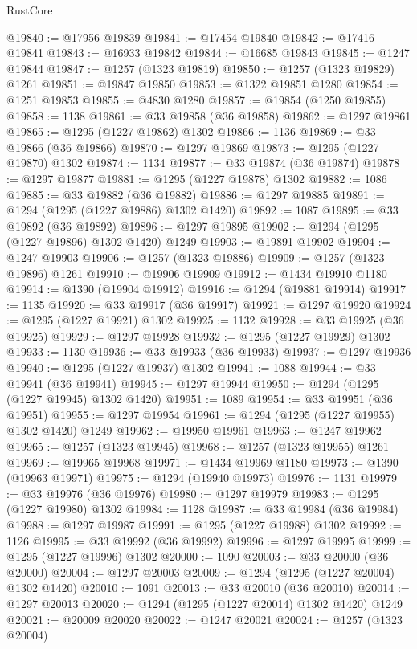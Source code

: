 \begin{lexlean}{RustCore}
\begin{coremodule}
@19840 := @17956 @19839
@19841 := @17454 @19840
@19842 := @17416 @19841
@19843 := @16933 @19842
@19844 := @16685 @19843
@19845 := @1247 @19844
@19847 := @1257 (@1323 @19819)
@19850 := @1257 (@1323 @19829) @1261
@19851 := @19847 @19850
@19853 := @1322 @19851 @1280
@19854 := @1251 @19853
@19855 := @4830 @1280
@19857 := @19854 (@1250 @19855)
@19858 := 1138
@19861 := @33 @19858 (@36 @19858)
@19862 := @1297 @19861
@19865 := @1295 (@1227 @19862) @1302
@19866 := 1136
@19869 := @33 @19866 (@36 @19866)
@19870 := @1297 @19869
@19873 := @1295 (@1227 @19870) @1302
@19874 := 1134
@19877 := @33 @19874 (@36 @19874)
@19878 := @1297 @19877
@19881 := @1295 (@1227 @19878) @1302
@19882 := 1086
@19885 := @33 @19882 (@36 @19882)
@19886 := @1297 @19885
@19891 := @1294 (@1295 (@1227 @19886) @1302 @1420)
@19892 := 1087
@19895 := @33 @19892 (@36 @19892)
@19896 := @1297 @19895
@19902 := @1294 (@1295 (@1227 @19896) @1302 @1420) @1249
@19903 := @19891 @19902
@19904 := @1247 @19903
@19906 := @1257 (@1323 @19886)
@19909 := @1257 (@1323 @19896) @1261
@19910 := @19906 @19909
@19912 := @1434 @19910 @1180
@19914 := @1390 (@19904 @19912)
@19916 := @1294 (@19881 @19914)
@19917 := 1135
@19920 := @33 @19917 (@36 @19917)
@19921 := @1297 @19920
@19924 := @1295 (@1227 @19921) @1302
@19925 := 1132
@19928 := @33 @19925 (@36 @19925)
@19929 := @1297 @19928
@19932 := @1295 (@1227 @19929) @1302
@19933 := 1130
@19936 := @33 @19933 (@36 @19933)
@19937 := @1297 @19936
@19940 := @1295 (@1227 @19937) @1302
@19941 := 1088
@19944 := @33 @19941 (@36 @19941)
@19945 := @1297 @19944
@19950 := @1294 (@1295 (@1227 @19945) @1302 @1420)
@19951 := 1089
@19954 := @33 @19951 (@36 @19951)
@19955 := @1297 @19954
@19961 := @1294 (@1295 (@1227 @19955) @1302 @1420) @1249
@19962 := @19950 @19961
@19963 := @1247 @19962
@19965 := @1257 (@1323 @19945)
@19968 := @1257 (@1323 @19955) @1261
@19969 := @19965 @19968
@19971 := @1434 @19969 @1180
@19973 := @1390 (@19963 @19971)
@19975 := @1294 (@19940 @19973)
@19976 := 1131
@19979 := @33 @19976 (@36 @19976)
@19980 := @1297 @19979
@19983 := @1295 (@1227 @19980) @1302
@19984 := 1128
@19987 := @33 @19984 (@36 @19984)
@19988 := @1297 @19987
@19991 := @1295 (@1227 @19988) @1302
@19992 := 1126
@19995 := @33 @19992 (@36 @19992)
@19996 := @1297 @19995
@19999 := @1295 (@1227 @19996) @1302
@20000 := 1090
@20003 := @33 @20000 (@36 @20000)
@20004 := @1297 @20003
@20009 := @1294 (@1295 (@1227 @20004) @1302 @1420)
@20010 := 1091
@20013 := @33 @20010 (@36 @20010)
@20014 := @1297 @20013
@20020 := @1294 (@1295 (@1227 @20014) @1302 @1420) @1249
@20021 := @20009 @20020
@20022 := @1247 @20021
@20024 := @1257 (@1323 @20004)

\end{coremodule}
\end{lexlean}

